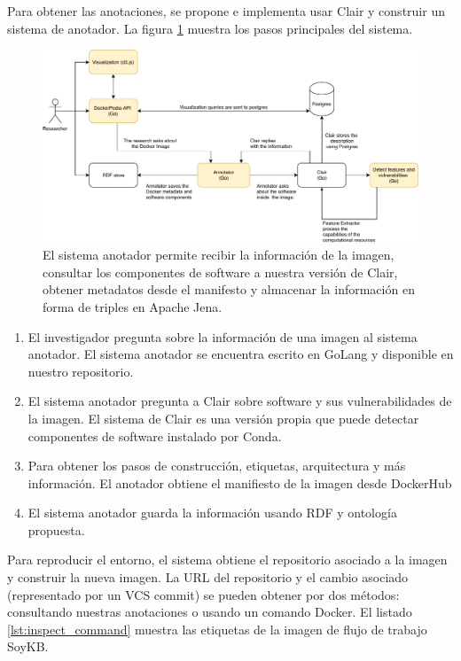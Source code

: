 Para obtener las anotaciones, se propone e implementa usar Clair y construir un sistema de anotador. La figura \ref{fig:arch} muestra los pasos principales del sistema.

\begin{figure}[t]
\includegraphics[width=\textwidth]{Figures/arch.pdf}
\caption[Arquitectura sistema anotador]{El sistema anotador permite recibir la información de la imagen, consultar los componentes de software a nuestra versión de Clair, obtener metadatos desde el manifesto y almacenar la información en forma de triples en Apache Jena.}\label{fig:arch}
\end{figure}


\begin{enumerate}
    \item El investigador pregunta sobre la información de una imagen al sistema anotador. El sistema anotador se encuentra escrito en GoLang y disponible en nuestro repositorio.
    \item El sistema anotador pregunta a Clair sobre software y sus vulnerabilidades de la imagen. El sistema de Clair es una versión propia que puede detectar componentes de software instalado por Conda.
    \item Para obtener los pasos de construcción, etiquetas, arquitectura y más información. El anotador obtiene el manifiesto de la imagen desde DockerHub
    \item El sistema anotador guarda la información usando RDF y ontología propuesta.
\end{enumerate}


Para reproducir el entorno, el sistema obtiene el repositorio asociado a la imagen y construir la nueva imagen. La URL del repositorio y el cambio asociado (representado por un VCS commit) se pueden obtener por dos métodos: consultando nuestras anotaciones o usando un comando Docker. El listado \ref{lst:inspect_command} muestra las etiquetas de la imagen de flujo de trabajo SoyKB.

